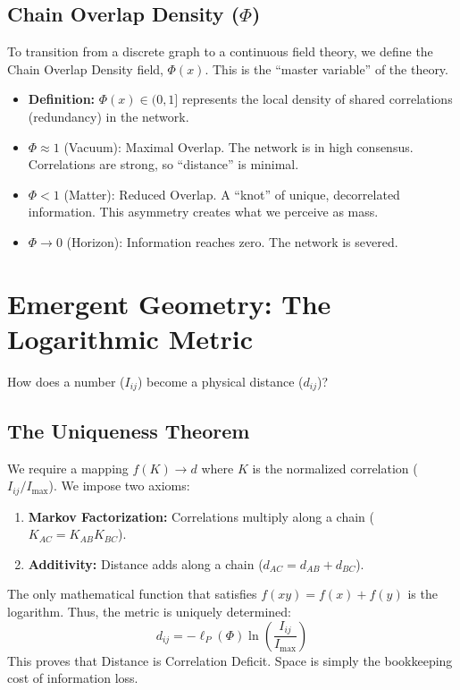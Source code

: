 \documentclass{article}
\begin{document}
\subsection{Chain Overlap Density ($\Phi$)}
To transition from a discrete graph to a continuous field theory, we define the Chain Overlap Density field, $\Phi(x)$. This is the ``master variable'' of the theory.
\begin{itemize}
    \item \textbf{Definition:} $\Phi(x) \in (0,1]$ represents the local density of shared correlations (redundancy) in the network.
    \item $\Phi \approx 1$ (Vacuum): Maximal Overlap. The network is in high consensus. Correlations are strong, so ``distance'' is minimal.
    \item $\Phi < 1$ (Matter): Reduced Overlap. A ``knot'' of unique, decorrelated information. This asymmetry creates what we perceive as mass.
    \item $\Phi \to 0$ (Horizon): Information reaches zero. The network is severed.
\end{itemize}

\section{Emergent Geometry: The Logarithmic Metric}
How does a number ($I_{ij}$) become a physical distance ($d_{ij}$)?

\subsection{The Uniqueness Theorem}
We require a mapping $f(K) \to d$ where $K$ is the normalized correlation ($I_{ij}/I_{\max}$). We impose two axioms:
\begin{enumerate}
    \item \textbf{Markov Factorization:} Correlations multiply along a chain ($K_{AC} = K_{AB}K_{BC}$).
    \item \textbf{Additivity:} Distance adds along a chain ($d_{AC} = d_{AB} + d_{BC}$).
\end{enumerate}
The only mathematical function that satisfies $f(xy) = f(x) + f(y)$ is the logarithm. Thus, the metric is uniquely determined:
\begin{equation}
    \boxed{d_{ij} = -\ell_P(\Phi) \ln\left( \frac{I_{ij}}{I_{\max}} \right)}
\end{equation}
This proves that Distance is Correlation Deficit. Space is simply the bookkeeping cost of information loss.
\end{document}
